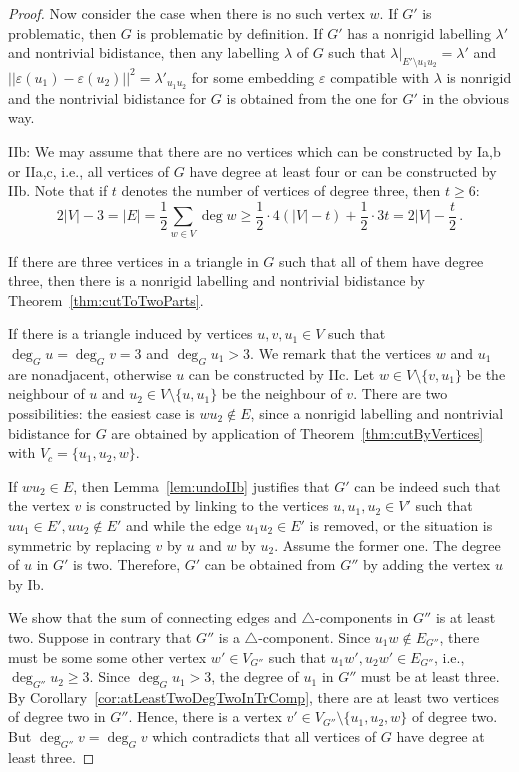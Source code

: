 \documentclass[a4paper, 11pt]{article}
\newcommand{\trcomp}{$\triangle$-component}
\newcommand{\trcomps}{$\triangle$-components}
\theoremstyle{definition}
\begin{document}
\begin{proof}
Now consider the case when there is no such vertex $w$. If $G'$ is problematic, then $G$ is problematic by definition. If $G'$ has a nonrigid labelling $\lambda'$ and nontrivial bidistance, then any labelling $\lambda$ of $G$ such that $\lambda|_{E'\setminus u_1u_2}=\lambda'$ and $||\varepsilon(u_1)-\varepsilon(u_2)||^2=\lambda'_{u_1u_2}$ for some embedding $\varepsilon$ compatible with $\lambda$ is nonrigid and the nontrivial bidistance for $G$ is obtained from the one for $G'$ in the obvious way.

IIb: We may assume that there are no vertices which can be constructed by Ia,b or IIa,c, i.e., all vertices of $G$ have degree at least four or can be constructed by IIb. Note that if $t$ denotes the number of vertices of degree three, then $t\geq 6$:
$$
2|V|-3=|E|=\frac{1}{2} \sum_{w\in V} \deg w\geq \frac{1}{2}\cdot 4(|V|-t)+\frac{1}{2}\cdot 3 t=2|V|-\frac{t}{2}\,.
$$

If there are three vertices in a triangle in $G$ such that all of them have degree three, then there is a nonrigid labelling and nontrivial bidistance by Theorem~\ref{thm:cutToTwoParts}.

If there is a triangle induced by vertices $u,v, u_1\in V$ such that $\deg_G u =\deg_G v=3$ and $\deg_G u_1>3$. We remark that the vertices $w$ and $u_1$ are nonadjacent, otherwise $u$ can be constructed by IIc. Let $w\in V\setminus \{v, u_1\}$ be the neighbour of $u$ and $u_2\in V\setminus \{u, u_1\}$ be the neighbour of $v$. There are two possibilities: the easiest case is  $wu_2\notin E$, since  a nonrigid labelling and nontrivial bidistance for $G$ are obtained by application of Theorem~\ref{thm:cutByVertices} with $V_c=\{u_1,u_2,w\}$. 

If $wu_2\in E$, then Lemma~\ref{lem:undoIIb} justifies that $G'$ can be indeed such that the vertex $v$ is constructed by linking to the vertices $u,u_1,u_2 \in V'$ such that $uu_1\in E',uu_2\notin E'$ and while the edge $u_1u_2\in E'$ is removed, or the situation is symmetric by replacing $v$ by $u$ and $w$ by $u_2$. Assume the former one. The degree of $u$ in $G'$ is two. Therefore, $G'$ can be obtained from $G''$ by adding the vertex $u$ by Ib. 

We show that the sum of connecting edges and \trcomps{} in $G''$ is at least two. Suppose in contrary that $G''$ is a \trcomp{}. Since $u_1w\notin E_{G''}$, there must be some some other vertex $w'\in V_{G''}$ such that $u_1w',u_2w'\in E_{G''}$, i.e., $\deg_{G''} u_2 \geq 3$. Since $\deg_G u_1>3$, the degree of $u_1$ in $G''$ must be at least three. By Corollary~\ref{cor:atLeastTwoDegTwoInTrComp}, there are at least two vertices of degree two in $G''$. Hence, there is a vertex $v'\in V_{G''}\setminus\{u_1,u_2,w\}$ of degree two. But $\deg_{G''}v=\deg_G v$ which contradicts that all vertices of $G$ have degree at least three. 


\end{proof}
\end{document}

